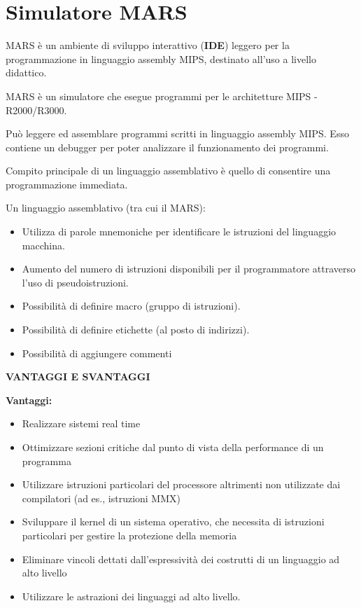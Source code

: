 \documentclass[12pt]{article}
\begin{document}
\section{Simulatore MARS}
MARS è un ambiente di sviluppo interattivo (\textbf{IDE}) leggero per la programmazione in linguaggio assembly MIPS, destinato all'uso a livello didattico.\par\medskip\noindent 
MARS è un simulatore che esegue programmi per le architetture MIPS - R2000/R3000.\par\medskip\noindent 
Può leggere ed assemblare programmi scritti in linguaggio assembly MIPS. Esso contiene un debugger per poter analizzare il funzionamento dei programmi.\par\medskip\noindent
Compito principale di un linguaggio assemblativo è quello di consentire una programmazione immediata.\par\medskip\noindent
Un linguaggio assemblativo (tra cui il MARS): 
\begin{itemize}
\item Utilizza di parole mnemoniche per identificare le istruzioni del linguaggio macchina.
\item Aumento del numero di istruzioni disponibili per il programmatore attraverso l’uso di pseudoistruzioni.
\item Possibilità di definire macro (gruppo di istruzioni).
\item Possibilità di definire etichette (al posto di indirizzi).
\item Possibilità di aggiungere commenti
\end{itemize}
\vspace{\baselineskip}
\textbf{VANTAGGI E SVANTAGGI}\par\medskip\noindent
\textbf{Vantaggi:}
\begin{itemize}
\item Realizzare sistemi real time
\item Ottimizzare sezioni critiche dal punto di vista della performance di un programma 
\item Utilizzare istruzioni particolari del processore altrimenti non utilizzate dai compilatori (ad es., istruzioni MMX)
\item Sviluppare il kernel di un sistema operativo, che necessita di istruzioni particolari per gestire la protezione della memoria
\item Eliminare vincoli dettati dall’espressività dei costrutti di un linguaggio ad alto livello 
\item Utilizzare le astrazioni dei linguaggi ad alto livello.\par\medskip\noindent
\end{itemize}
\end{document}
